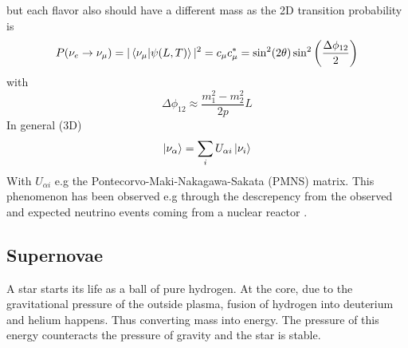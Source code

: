 \documentclass[11pt,a4paper,faculty=we,language=en,doctype=report]{cls/ugent-doc}
\begin{document}
but each flavor also should have a different mass
as the 2D transition probability is
\begin{equation}
	P(\nu_e\rightarrow\nu_\mu) = |\braket{\nu_\mu|\psi(L,T)}|^2 = c_\mu c_\mu^* = \sin ^2(2 \theta) \sin ^2\left(\frac{\Delta \phi_{12}}{2}\right)
\end{equation}
with
\begin{equation}
	\Delta \phi_{12} \approx \frac{m_1^2 - m_2^2}{2p}L
\end{equation}
In general (3D)
\begin{equation}
	\ket{\nu_\alpha} = \sum_iU_{\alpha i} \ket{\nu_i}
\end{equation}
With $U_{\alpha i}$ e.g the Pontecorvo-Maki-Nakagawa-Sakata (PMNS) matrix. 
This phenomenon has been observed e.g through the descrepency from the observed
and expected neutrino events coming from a nuclear reactor \cite{Eguchi_2003}.
\subsection{Supernovae}
\label{sec:supernovae}
A star starts its life as a ball of pure hydrogen. At the core, due to the
gravitational pressure of the outside plasma, fusion of hydrogen into deuterium
and helium happens. Thus converting mass into energy. The pressure of this energy
counteracts the pressure of gravity and the star is stable.
\end{document}
